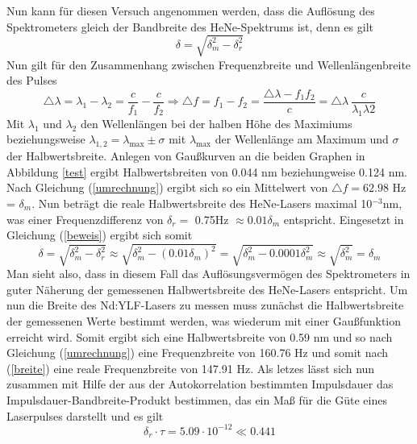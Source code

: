 Nun kann für diesen Versuch angenommen werden, dass die Auflösung des Spektrometers gleich der Bandbreite des HeNe-Spektrums ist, denn es gilt
\begin{equation}
\delta=\sqrt{\delta_m^2-\delta_r^2}
\label{beweis}
\end{equation}
Nun gilt für den Zusammenhang zwischen Frequenzbreite und Wellenlängenbreite des Pulses
\begin{equation}
\triangle\lambda=\lambda_1-\lambda_2=\frac{c}{f_1}-\frac{c}{f_2}\Rightarrow \triangle f=f_1-f_2=\frac{\triangle\lambda-f_1f_2}{c}=\triangle\lambda\:\frac{c}{\lambda_1\lambda2}
\label{umrechnung}
\end{equation}
Mit $\lambda_1$ und $\lambda_2$ den Wellenlängen bei der halben Höhe des Maximiums beziehungsweise $\lambda_{1,2}=\lambda_{\text{max}}\pm\sigma$ mit $\lambda_{\text{max}}$ der Wellenlänge am Maximum und $\sigma$ der Halbwertsbreite. Anlegen von Gaußkurven an die beiden Graphen in Abbildung \ref{test} ergibt Halbwertsbreiten von 0.044 nm beziehungweise 0.124 nm. Nach Gleichung (\ref{umrechnung}) ergibt sich so ein Mittelwert von $\triangle f=62.98$ Hz = $\delta_m$. Nun beträgt die reale Halbwertsbreite des HeNe-Lasers maximal 10$^{-3}$nm, was einer Frequenzdifferenz von $\delta_r=$ 0.75Hz $\approx0.01\delta_m$ entspricht. Eingesetzt in Gleichung (\ref{beweis}) ergibt sich somit
\begin{equation*}
\delta=\sqrt{\delta_m^2-\delta_r^2}\approx\sqrt{\delta_m^2-(0.01\delta_m)^2}=\sqrt{\delta_m^2-0.0001\delta_m^2}\approx\sqrt{\delta_m^2}=\delta_m
\end{equation*}
Man sieht also, dass in diesem Fall das Auflösungsvermögen des Spektrometers in guter Näherung der gemessenen Halbwertsbreite des HeNe-Lasers entspricht. Um nun die Breite des Nd:YLF-Lasers zu messen muss zunächst die Halbwertsbreite der gemessenen Werte bestimmt werden, was wiederum mit einer Gaußfunktion erreicht wird. Somit ergibt sich eine Halbwertsbreite von 0.59 nm und so nach Gleichung (\ref{umrechnung}) eine Frequenzbreite von 160.76 Hz und somit nach (\ref{breite}) eine reale Frequenzbreite von 147.91 Hz.\newline
Als letzes lässt sich nun zusammen mit Hilfe der aus der Autokorrelation bestimmten Impulsdauer das Impulsdauer-Bandbreite-Produkt bestimmen, das ein Maß für die Güte eines Laserpulses darstellt und es gilt
\begin{equation}
\delta_r\cdot\tau=5.09\cdot10^{-12}\ll 0.441
\end{equation}